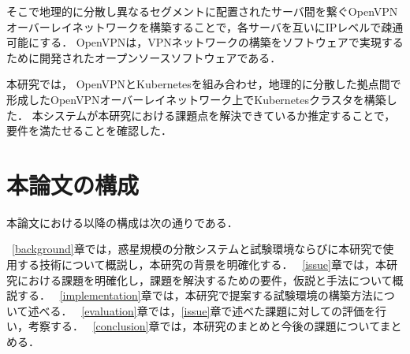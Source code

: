 そこで地理的に分散し異なるセグメントに配置されたサーバ間を繋ぐOpenVPNオーバーレイネットワークを構築することで，各サーバを互いにIPレベルで疎通可能にする．
OpenVPNは，VPNネットワークの構築をソフトウェアで実現するために開発されたオープンソースソフトウェアである．

本研究では， OpenVPNとKubernetesを組み合わせ，地理的に分散した拠点間で形成したOpenVPNオーバーレイネットワーク上でKubernetesクラスタを構築した．
本システムが本研究における課題点を解決できているか推定することで，要件を満たせることを確認した．

\section{本論文の構成}
\label{introduction:structure}

本論文における以降の構成は次の通りである．

~\ref{background}章では，惑星規模の分散システムと試験環境ならびに本研究で使用する技術について概説し，本研究の背景を明確化する．
~\ref{issue}章では，本研究における課題を明確化し，課題を解決するための要件，仮説と手法について概説する．
~\ref{implementation}章では，本研究で提案する試験環境の構築方法について述べる．
~\ref{evaluation}章では，\ref{issue}章で述べた課題に対しての評価を行い，考察する．
~\ref{conclusion}章では，本研究のまとめと今後の課題についてまとめる．

